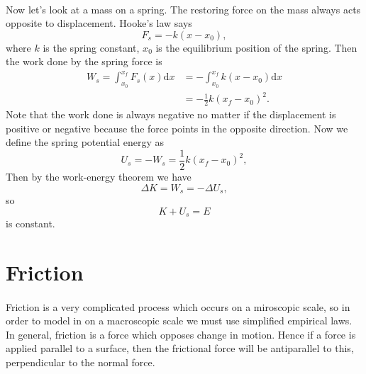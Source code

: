 \documentclass[../classical_mechanics.tex]{subfiles}
\begin{document}
        \paragraph{}
        Now let's look at a mass on a spring. The restoring force on the mass always acts opposite to displacement. Hooke's law says
        \begin{equation}
            F_s = -k(x-x_0),
        \end{equation}
        where $k$ is the spring constant, $x_0$ is the equilibrium position of the spring.
        Then the work done by the spring force is
        \begin{align}
            W_s = \int_{x_0}^{x_f}F_s(x)\mathrm{d}x &= -\int_{x_0}^{x_f}k(x-x_0)\mathrm{d}x\\
            &=-\frac{1}{2}k(x_f-x_0)^2.
        \end{align}
        Note that the work done is always negative no matter if the displacement is positive or negative because the force points in the opposite direction.
        Now we define the spring potential energy as
        \begin{equation}
            U_s = -W_s = \frac{1}{2}k(x_f-x_0)^2,
        \end{equation}
        Then by the work-energy theorem we have
        \begin{equation}
            \Delta K = W_s = -\Delta U_s,
        \end{equation}
        so
        \begin{equation}
            K + U_s = E
        \end{equation}
        is constant.

    \section{Friction}
        \paragraph{}
        Friction is a very complicated process which occurs on a miroscopic scale, so in order to model in on a macroscopic scale we must use simplified empirical laws.
        In general, friction is a force which opposes change in motion. Hence if a force is applied parallel to a surface, then the frictional force will be antiparallel to this, perpendicular to the normal force.
\end{document}
